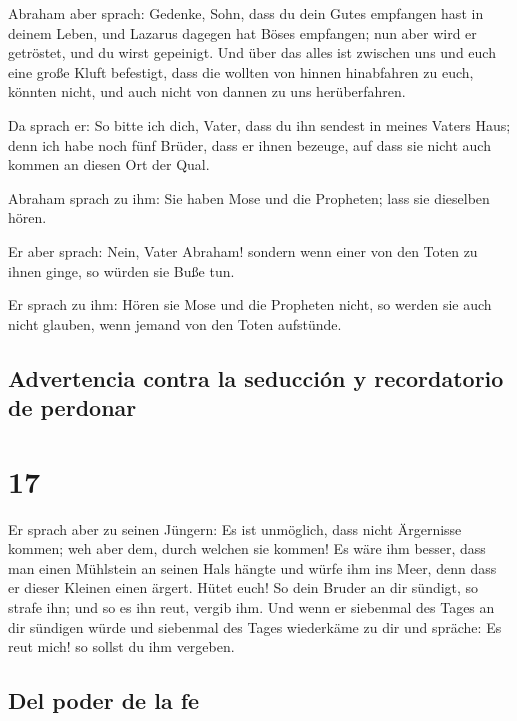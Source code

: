  Abraham aber sprach: Gedenke, Sohn, dass du dein Gutes
empfangen hast in deinem Leben, und Lazarus dagegen hat Böses empfangen;
nun aber wird er getröstet, und du wirst gepeinigt.  Und
über das alles ist zwischen uns und euch eine große Kluft befestigt,
dass die wollten von hinnen hinabfahren zu euch, könnten nicht, und auch
nicht von dannen zu uns herüberfahren.

 Da sprach er: So bitte ich dich, Vater, dass du ihn
sendest in meines Vaters Haus;  denn ich habe noch fünf
Brüder, dass er ihnen bezeuge, auf dass sie nicht auch kommen an diesen
Ort der Qual.

 Abraham sprach zu ihm: Sie haben Mose und die Propheten;
lass sie dieselben hören.

 Er aber sprach: Nein, Vater Abraham! sondern wenn einer
von den Toten zu ihnen ginge, so würden sie Buße tun.

 Er sprach zu ihm: Hören sie Mose und die Propheten
nicht, so werden sie auch nicht glauben, wenn jemand von den Toten
aufstünde.

\hypertarget{advertencia-contra-la-seducciuxf3n-y-recordatorio-de-perdonar}{%
\subsection{Advertencia contra la seducción y recordatorio de
perdonar}\label{advertencia-contra-la-seducciuxf3n-y-recordatorio-de-perdonar}}

\hypertarget{section-16}{%
\section{17}\label{section-16}}

 Er sprach aber zu seinen Jüngern: Es ist unmöglich, dass
nicht Ärgernisse kommen; weh aber dem, durch welchen sie kommen!
 Es wäre ihm besser, dass man einen Mühlstein an seinen
Hals hängte und würfe ihm ins Meer, denn dass er dieser Kleinen einen
ärgert.  Hütet euch! So dein Bruder an dir sündigt, so
strafe ihn; und so es ihn reut, vergib ihm.  Und wenn er
siebenmal des Tages an dir sündigen würde und siebenmal des Tages
wiederkäme zu dir und spräche: Es reut mich! so sollst du ihm vergeben.

\hypertarget{del-poder-de-la-fe}{%
\subsection{Del poder de la fe}\label{del-poder-de-la-fe}}


